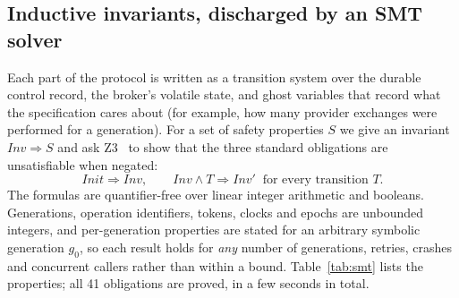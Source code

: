 \documentclass[11pt]{article}
\begin{document}
\subsection{Inductive invariants, discharged by an SMT solver}
\label{sec:smt}
Each part of the protocol is written as a transition system over the durable control record, the broker's volatile state, and ghost variables that record what the specification cares about (for example, how many provider exchanges were performed for a generation). For a set of safety properties $S$ we give an invariant $\mathit{Inv} \Rightarrow S$ and ask Z3~\cite{z3} to show that the three standard obligations are unsatisfiable when negated:
\[
\mathit{Init} \Rightarrow \mathit{Inv}, \qquad \mathit{Inv} \wedge T \Rightarrow \mathit{Inv}' \ \text{ for every transition } T .
\]
The formulas are quantifier-free over linear integer arithmetic and booleans. Generations, operation identifiers, tokens, clocks and epochs are unbounded integers, and per-generation properties are stated for an arbitrary symbolic generation $g_0$, so each result holds for \emph{any} number of generations, retries, crashes and concurrent callers rather than within a bound. Table~\ref{tab:smt} lists the properties; all 41 obligations are proved, in a few seconds in total.
\end{document}
